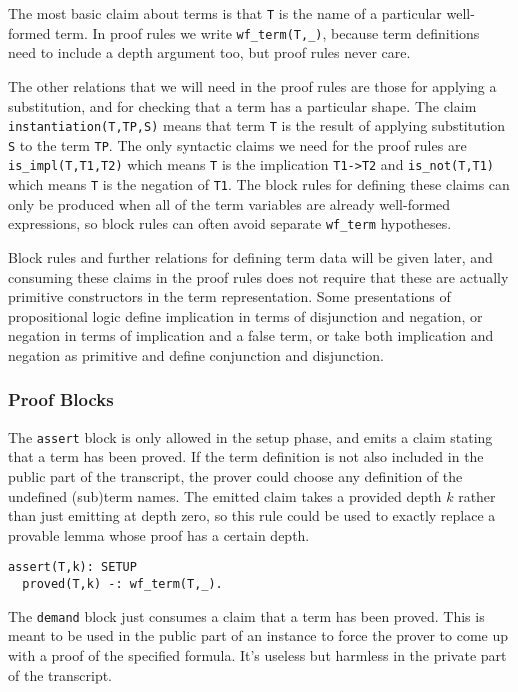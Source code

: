 \documentclass{article}
\theoremstyle{plain}
\theoremstyle{definition}
\begin{document}
The most basic claim about terms is that \texttt{T} is the name of a
particular well-formed term. In proof rules we write
\texttt{wf\_term(T,\_)}, because term definitions need to include a depth
argument too, but proof rules never care.

The other relations that we will need in the proof rules are those
for applying a substitution, and for checking that a term has a particular shape.
The claim \texttt{instantiation(T,TP,S)} means that term \texttt{T} is
the result of applying substitution \texttt{S} to the term \texttt{TP}.
The only syntactic claims we need for the proof rules are
\texttt{is\_impl(T,T1,T2)} which means
\texttt{T} is the implication \texttt{T1-\textgreater{}T2}
and \texttt{is\_not(T,T1)} which means \texttt{T} is the negation of \texttt{T1}.
The block rules for defining these claims can only be produced when all of the term variables are
already well-formed expressions, so block rules can often avoid
separate \texttt{wf\_term} hypotheses.

Block rules and further relations for defining term data will be given
later, and consuming these claims in the proof rules does not require
that these are actually primitive constructors in the term representation.
Some presentations of propositional logic define implication in terms
of disjunction and negation, or negation in terms of implication and
a false term, or take both implication and negation as primitive and
define conjunction and disjunction.

\subsubsection{Proof Blocks}\label{sec:prop-example-proof-blocks}

The \texttt{assert} block is only allowed in the setup phase, and emits a
claim stating that a term has been proved.
If the term definition is not also included in the public part of the
transcript, the prover could choose any definition of the undefined 
(sub)term names.
The emitted claim takes a provided depth $k$ rather than just emitting
at depth zero, so this rule could be used to exactly replace a provable
lemma whose proof has a certain depth.

\begin{verbatim}
assert(T,k): SETUP
  proved(T,k) -: wf_term(T,_).
\end{verbatim}

The \texttt{demand} block just consumes a claim that a term has been proved.
This is meant to be used in the public part of an instance to force the
prover to come up with a proof of the specified formula.
It's useless but harmless in the private part of the transcript.
\end{document}
